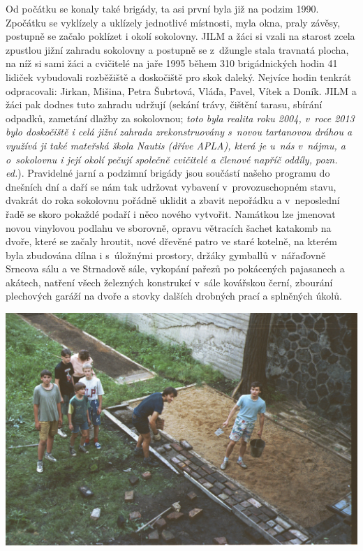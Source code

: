\documentclass[a5paper, 11pt, twoside]{article}
\begin{document}
Od počátku se konaly také brigády, ta asi první byla již na podzim 1990.
Zpočátku se vyklízely a uklízely jednotlivé místnosti, myla okna, praly
závěsy, postupně se začalo poklízet i okolí sokolovny. JILM a žáci si
vzali na starost zcela zpustlou jižní zahradu sokolovny a postupně se
z~džungle stala travnatá plocha, na níž si sami žáci a cvičitelé na jaře
1995 během 310 brigádnických hodin 41 lidiček vybudovali rozběžiště a
doskočiště pro skok daleký. Nejvíce hodin tenkrát odpracovali: Jirkan,
Mišina, Petra Šubrtová, Vláďa, Pavel, Vítek a Doník. JILM a žáci pak
dodnes tuto zahradu udržují (sekání trávy, čištění tarasu, sbírání
odpadků, zametání dlažby za sokolovnou; \textit{toto byla realita roku
2004, v~roce 2013 bylo doskočiště i celá jižní zahrada zrekonstruovány
s~novou tartanovou dráhou a využívá ji také mateřská škola Nautis (dříve
APLA), která je u~nás v~nájmu, a o~sokolovnu i její okolí pečují
společně cvičitelé a členové napříč oddíly, pozn. ed.}). Pravidelné
jarní a podzimní brigády jsou součástí našeho programu do dnešních dní a
daří se nám tak udržovat vybavení v~provozuschopném stavu, dvakrát do
roka sokolovnu pořádně uklidit a zbavit nepořádku a v~neposlední řadě se
skoro pokaždé podaří i něco nového vytvořit. Namátkou lze jmenovat novou
vinylovou podlahu ve sborovně, opravu větracích šachet katakomb na
dvoře, které se začaly hroutit, nové dřevěné patro ve staré kotelně, na
kterém byla zbudována dílna i s~úložnými prostory, držáky gymballů
v~nářaďovně Srncova sálu a ve Strnadově sále, vykopání pařezů po
pokácených pajasanech a akátech, natření všech železných konstrukcí
v~sále kovářskou černí, zbourání plechových garáží na dvoře a stovky
dalších drobných prací a splněných úkolů.

 \includegraphics[width=\textwidth]{img/40_doskociste.jpg}
\end{document}
